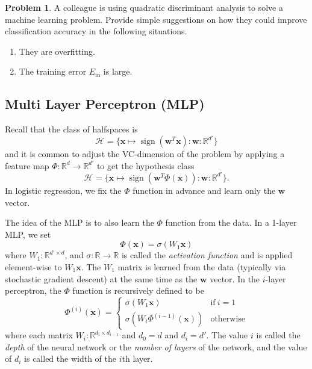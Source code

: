 \documentclass[10pt]{exam}
\theoremstyle{definition}
\newtheorem{problem}{Problem}
\newcommand{\R}{\mathbb R}
\DeclareMathOperator{\sign}{sign}
\newcommand{\Ein}{E_{\text{in}}}
\newcommand{\trans}[1]{{#1}^{T}}
\newcommand{\w}{\mathbf w}
\newcommand{\x}{\mathbf x}
\newcommand{\HH}[1]{\mathcal H_{\text{#1}}}
\begin{document}
\newpage
\begin{problem}
    A colleague is using quadratic discriminant analysis to solve a machine learning problem.
    Provide simple suggestions on how they could improve classification accuracy in the following situations.
    \begin{enumerate}
        \item
            They are overfitting.
            \vspace{4in}
        \item
            The training error $\Ein$ is large.
    \end{enumerate}
\end{problem}


\newpage
\subsection{Multi Layer Perceptron (MLP)}

Recall that the class of halfspaces is
\begin{equation}
    \HH{} = \bigg\{ \x \mapsto \sign(\trans\w \x) : \w : \R^{d'} \bigg\}
\end{equation}
and it is common to adjust the VC-dimension of the problem by applying a feature map
$\Phi : \R^d \to \R^{d'}$ to get the hypothesis class
\begin{equation}
    \HH{} = \bigg\{ \x \mapsto \sign(\trans\w \Phi(\x)) : \w : \R^{d'} \bigg\}
    .
\end{equation}
In logistic regression, we fix the $\Phi$ function in advance and learn only the $\w$ vector.

The idea of the MLP is to also learn the $\Phi$ function from the data.
In a 1-layer MLP, we set
\begin{equation}
    \Phi(\x) = \sigma ( W_1 \x)
\end{equation}
where $W_1 : \R^{d'\times d}$,
and $\sigma : \R \to \R$ is called the \emph{activation function} and is applied element-wise to $W_1\x$.
The $W_1$ matrix is learned from the data (typically via stochastic gradient descent) at the same time as the $\w$ vector.
In the $i$-layer perceptron, the $\Phi$ function is recursively defined to be
\begin{equation}
    \Phi^{(i)}(\x) =
    \begin{cases}
        \sigma (W_1 \x) & \text{if}~i = 1 \\
        \sigma (W_i \Phi^{(i-1)}(\x)) & \text{otherwise}
    \end{cases}
\end{equation}
where each matrix $W_i : \R^{d_i \times d_{i-1}}$ and $d_0 = d$ and $d_i = d'$.
The value $i$ is called the \emph{depth} of the neural network or the \emph{number of layers} of the network, and the value of $d_i$ is called the width of the $i$th layer.
\end{document}
